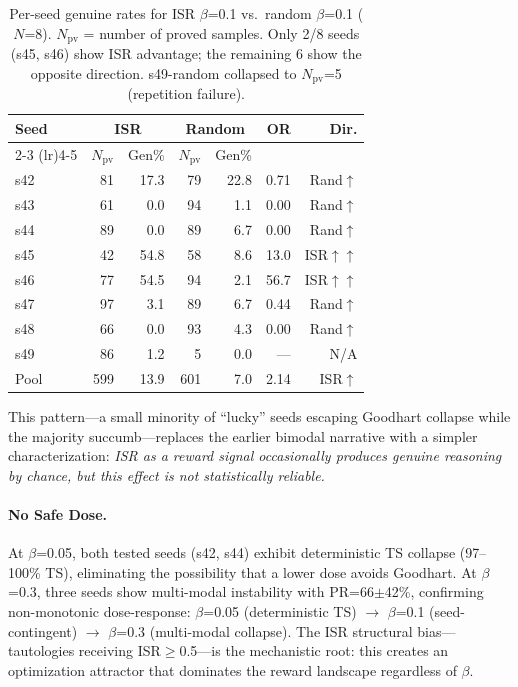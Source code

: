 \documentclass[11pt,a4paper]{article}
\newcommand{\isr}{\textsc{ISR}}
\newcommand{\pr}{\textsc{PR}}
\begin{document}
\begin{table}[t]
\centering
\small
\setlength{\tabcolsep}{3.5pt}
\begin{tabular}{lrrrrrr}
\toprule
Seed & \multicolumn{2}{c}{\isr{}} & \multicolumn{2}{c}{Random} & OR & Dir. \\
\cmidrule(lr){2-3} \cmidrule(lr){4-5}
 & $N_{\text{pv}}$ & Gen\% & $N_{\text{pv}}$ & Gen\% & & \\
\midrule
s42 & 81 & 17.3 & 79 & 22.8 & 0.71 & Rand$\uparrow$ \\
s43 & 61 & 0.0 & 94 & 1.1 & 0.00 & Rand$\uparrow$ \\
s44 & 89 & 0.0 & 89 & 6.7 & 0.00 & Rand$\uparrow$ \\
s45 & 42 & 54.8 & 58 & 8.6 & 13.0 & \isr{}$\uparrow\uparrow$ \\
s46 & 77 & 54.5 & 94 & 2.1 & 56.7 & \isr{}$\uparrow\uparrow$ \\
s47 & 97 & 3.1 & 89 & 6.7 & 0.44 & Rand$\uparrow$ \\
s48 & 66 & 0.0 & 93 & 4.3 & 0.00 & Rand$\uparrow$ \\
s49 & 86 & 1.2 & 5 & 0.0 & --- & N/A \\
\midrule
Pool & 599 & 13.9 & 601 & 7.0 & 2.14 & \isr{}$\uparrow$ \\
\bottomrule
\end{tabular}
\caption{Per-seed genuine rates for \isr{} $\beta$=0.1 vs.\ random $\beta$=0.1 ($N$=8). $N_{\text{pv}}$ = number of proved samples. Only 2/8 seeds (s45, s46) show \isr{} advantage; the remaining 6 show the opposite direction. s49-random collapsed to $N_{\text{pv}}$=5 (repetition failure).}
\label{tab:n8-perseed}
\end{table}

This pattern---a small minority of ``lucky'' seeds escaping Goodhart collapse while the majority succumb---replaces the earlier bimodal narrative with a simpler characterization: \emph{\isr{} as a reward signal occasionally produces genuine reasoning by chance, but this effect is not statistically reliable.}

\paragraph{No Safe Dose.}
At $\beta$=0.05, both tested seeds (s42, s44) exhibit deterministic TS collapse (97--100\% TS), eliminating the possibility that a lower dose avoids Goodhart.
At $\beta$=0.3, three seeds show multi-modal instability with \pr{}=66$\pm$42\%, confirming non-monotonic dose-response: $\beta$=0.05 (deterministic TS) $\rightarrow$ $\beta$=0.1 (seed-contingent) $\rightarrow$ $\beta$=0.3 (multi-modal collapse).
The \isr{} structural bias---tautologies receiving \isr{}$\geq$0.5---is the mechanistic root: this creates an optimization attractor that dominates the reward landscape regardless of $\beta$.
\end{document}
